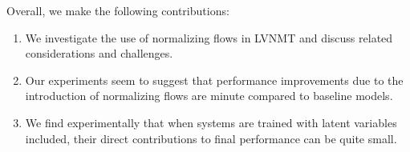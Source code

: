 
Overall, we make the following contributions:
\begin{enumerate}
	\item We investigate the use of normalizing flows in \ac{LVNMT} and discuss related considerations and challenges.
	
	\item Our experiments seem to suggest that performance improvements due to the introduction of normalizing flows are minute compared to baseline models. 
	
	\item We find experimentally that when systems are trained with latent variables included, their direct contributions to final performance can be quite small. 
\end{enumerate}



